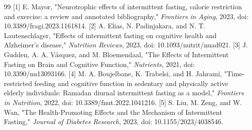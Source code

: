 \documentclass[11pt]{article}
\begin{document}
\begin{thebibliography}{99}
 [1] E. Mayor, "Neurotrophic effects of intermittent fasting, calorie restriction and exercise: a review and annotated bibliography," \textit{Frontiers in Aging}, 2023, doi: 10.3389/fragi.2023.1161814.
 [2] A. Elias, N. Padinjakara, and N. T. Lautenschlager, "Effects of intermittent fasting on cognitive health and Alzheimer’s disease," \textit{Nutrition Reviews}, 2023, doi: 10.1093/nutrit/nuad021.
 [3] J. Gudden, A. A. Vásquez, and M. Bloemendaal, "The Effects of Intermittent Fasting on Brain and Cognitive Function," \textit{Nutrients}, 2021, doi: 10.3390/nu13093166.
 [4] M. A. Boujelbane, K. Trabelsi, and H. Jahrami, "Time-restricted feeding and cognitive function in sedentary and physically active elderly individuals: Ramadan diurnal intermittent fasting as a model," \textit{Frontiers in Nutrition}, 2022, doi: 10.3389/fnut.2022.1041216.
 [5] S. Liu, M. Zeng, and W. Wan, "The Health-Promoting Effects and the Mechanism of Intermittent Fasting," \textit{Journal of Diabetes Research}, 2023, doi: 10.1155/2023/4038546.
\end{thebibliography}
\end{document}
